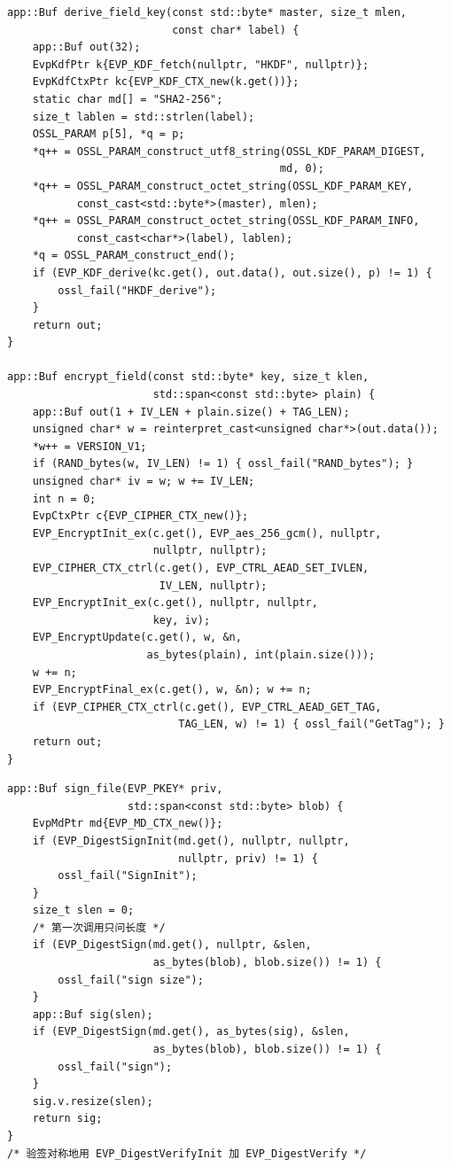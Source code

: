 \documentclass[12pt,a4paper,fontset=fandol]{ctexbook}
\begin{document}
\begin{lstlisting}[caption={C/C++：字段加密（AES-256-GCM, HKDF 派生）}]
app::Buf derive_field_key(const std::byte* master, size_t mlen,
                          const char* label) {
    app::Buf out(32);
    EvpKdfPtr k{EVP_KDF_fetch(nullptr, "HKDF", nullptr)};
    EvpKdfCtxPtr kc{EVP_KDF_CTX_new(k.get())};
    static char md[] = "SHA2-256";
    size_t lablen = std::strlen(label);
    OSSL_PARAM p[5], *q = p;
    *q++ = OSSL_PARAM_construct_utf8_string(OSSL_KDF_PARAM_DIGEST,
                                           md, 0);
    *q++ = OSSL_PARAM_construct_octet_string(OSSL_KDF_PARAM_KEY,
           const_cast<std::byte*>(master), mlen);
    *q++ = OSSL_PARAM_construct_octet_string(OSSL_KDF_PARAM_INFO,
           const_cast<char*>(label), lablen);
    *q = OSSL_PARAM_construct_end();
    if (EVP_KDF_derive(kc.get(), out.data(), out.size(), p) != 1) {
        ossl_fail("HKDF_derive");
    }
    return out;
}

app::Buf encrypt_field(const std::byte* key, size_t klen,
                       std::span<const std::byte> plain) {
    app::Buf out(1 + IV_LEN + plain.size() + TAG_LEN);
    unsigned char* w = reinterpret_cast<unsigned char*>(out.data());
    *w++ = VERSION_V1;
    if (RAND_bytes(w, IV_LEN) != 1) { ossl_fail("RAND_bytes"); }
    unsigned char* iv = w; w += IV_LEN;
    int n = 0;
    EvpCtxPtr c{EVP_CIPHER_CTX_new()};
    EVP_EncryptInit_ex(c.get(), EVP_aes_256_gcm(), nullptr,
                       nullptr, nullptr);
    EVP_CIPHER_CTX_ctrl(c.get(), EVP_CTRL_AEAD_SET_IVLEN,
                        IV_LEN, nullptr);
    EVP_EncryptInit_ex(c.get(), nullptr, nullptr,
                       key, iv);
    EVP_EncryptUpdate(c.get(), w, &n,
                      as_bytes(plain), int(plain.size()));
    w += n;
    EVP_EncryptFinal_ex(c.get(), w, &n); w += n;
    if (EVP_CIPHER_CTX_ctrl(c.get(), EVP_CTRL_AEAD_GET_TAG,
                           TAG_LEN, w) != 1) { ossl_fail("GetTag"); }
    return out;
}
\end{lstlisting}

\begin{lstlisting}[caption={C/C++：Ed25519 签名与验签}]
app::Buf sign_file(EVP_PKEY* priv,
                   std::span<const std::byte> blob) {
    EvpMdPtr md{EVP_MD_CTX_new()};
    if (EVP_DigestSignInit(md.get(), nullptr, nullptr,
                           nullptr, priv) != 1) {
        ossl_fail("SignInit");
    }
    size_t slen = 0;
    /* 第一次调用只问长度 */
    if (EVP_DigestSign(md.get(), nullptr, &slen,
                       as_bytes(blob), blob.size()) != 1) {
        ossl_fail("sign size");
    }
    app::Buf sig(slen);
    if (EVP_DigestSign(md.get(), as_bytes(sig), &slen,
                       as_bytes(blob), blob.size()) != 1) {
        ossl_fail("sign");
    }
    sig.v.resize(slen);
    return sig;
}
/* 验签对称地用 EVP_DigestVerifyInit 加 EVP_DigestVerify */
\end{lstlisting}
\end{document}
